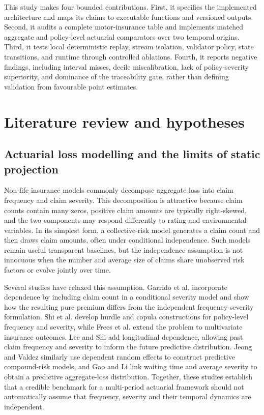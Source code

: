 This study makes four bounded contributions. First, it specifies the implemented architecture and maps its claims to executable functions and versioned outputs. Second, it audits a complete motor-insurance table and implements matched aggregate and policy-level actuarial comparators over two temporal origins. Third, it tests local deterministic replay, stream isolation, validator policy, state transitions, and runtime through controlled ablations. Fourth, it reports negative findings, including interval misses, decile miscalibration, lack of policy-severity superiority, and dominance of the traceability gate, rather than defining validation from favourable point estimates.

\section{Literature review and hypotheses}\label{sec:literature-review-and-hypotheses}

\subsection{Actuarial loss modelling and the limits of static projection}\label{sec:actuarial-loss-modelling-and-the-limits-of-static-projection}

Non-life insurance models commonly decompose aggregate loss into claim frequency and claim severity. This decomposition is attractive because claim counts contain many zeros, positive claim amounts are typically right-skewed, and the two components may respond differently to rating and environmental variables. In its simplest form, a collective-risk model generates a claim count and then draws claim amounts, often under conditional independence. Such models remain useful transparent baselines, but the independence assumption is not innocuous when the number and average size of claims share unobserved risk factors or evolve jointly over time.

Several studies have relaxed this assumption. Garrido et al. \cite{Garrido2016} incorporate dependence by including claim count in a conditional severity model and show how the resulting pure premium differs from the independent frequency-severity formulation. Shi et al. \cite{Shi2015} develop hurdle and copula constructions for policy-level frequency and severity, while Frees et al. \cite{Frees2016} extend the problem to multivariate insurance outcomes. Lee and Shi \cite{Lee2019} add longitudinal dependence, allowing past claim frequency and severity to inform the future predictive distribution. Jeong and Valdez \cite{Jeong2020} similarly use dependent random effects to construct predictive compound-risk models, and Gao and Li \cite{Gao2023} link waiting time and average severity to obtain a predictive aggregate-loss distribution. Together, these studies establish that a credible benchmark for a multi-period actuarial framework should not automatically assume that frequency, severity and their temporal dynamics are independent.

